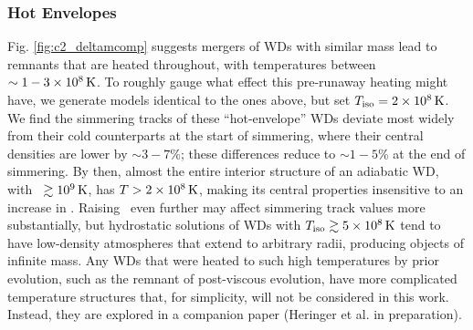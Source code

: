 \subsubsection{Hot Envelopes}
\label{sssec:c5_runaway_ad_hot}




Fig. \ref{fig:c2_deltamcomp} suggests mergers of WDs with similar mass lead to remnants that are heated throughout, with temperatures between $\sim 1 - 3\times10^8\,\mathrm{K}$.  To roughly gauge what effect this pre-runaway heating might have, we generate models identical to the ones above, but set $\tempiso = 2\times10^8\,\mrm{K}$.  We find the simmering tracks of these ``hot-envelope'' WDs deviate most widely from their cold counterparts at the start of simmering, where their central densities are lower by $\sim3-7$\%; these differences reduce to $\sim1 - 5$\% at the end of simmering.  By then, almost the entire interior structure of an adiabatic WD, with \Tc\ $\gtrsim10^9\,\mathrm{K}$, has $T > 2\times10^8\,\mathrm{K}$, making its central properties insensitive to an increase in \tempiso.  Raising \tempiso\ even further may affect simmering track values more substantially, but hydrostatic solutions of WDs with $\tempiso \gtrsim 5\times10^8\,\mrm{K}$ tend to have low-density atmospheres that extend to arbitrary radii, producing objects of infinite mass.  Any WDs that were heated to such high temperatures by prior evolution, such as the remnant of \cite{ji+13} post-viscous evolution, have more complicated temperature structures that, for simplicity, will not be considered in this work.  Instead, they are explored in a companion paper (Heringer et al. in preparation).

